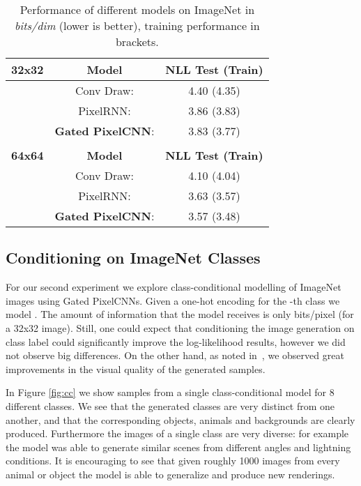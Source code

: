 \documentclass{article}
\begin{document}
\begin{table}[h]
\centering
  \begin{tabular}{lcc}
    \toprule
    \textbf{32x32} & \textbf{Model} & \textbf{NLL Test (Train)}  \\ 
    \midrule
      & Conv Draw: \cite{conceptcompression} & 4.40 (4.35) \\
      & PixelRNN: \cite{van2016pixel} & 3.86 (3.83) \\ 
      & \textbf{Gated PixelCNN}: & 3.83 (3.77) \\
    \\
    \textbf{64x64} & \textbf{Model} & \textbf{NLL Test (Train)}  \\ 
    \midrule
      & Conv Draw: \cite{conceptcompression} & 4.10 (4.04) \\
      & PixelRNN: \cite{van2016pixel} & 3.63 (3.57) \\ 
      & \textbf{Gated PixelCNN}: & 3.57 (3.48) \\
    \bottomrule
  \end{tabular}
\vspace{5pt}
\caption{Performance of different models on ImageNet in \emph{bits/dim} (lower is better), training performance in brackets.}
\label{table:imnet}
\end{table}

\subsection{Conditioning on ImageNet Classes}

For our second experiment we explore class-conditional modelling of ImageNet images using Gated PixelCNNs. Given a one-hot encoding  for the -th class we model . The amount of information that the model receives is only  bits/pixel (for a 32x32 image). Still, one could expect that conditioning the image generation on class label could significantly improve the log-likelihood results, however we did not observe big differences. On the other hand, as noted in~\cite{theis2015note}, we  observed great improvements in the visual quality of the generated samples.

In Figure \ref{fig:cc} we show samples from a single class-conditional model for 8 different classes. We see that the generated classes are very distinct from one another, and that the corresponding objects, animals and backgrounds are clearly produced. Furthermore the images of a single class are very diverse: for example the model was able to generate similar scenes from different angles and lightning conditions. 
It is encouraging to see that given roughly 1000 images from every animal or object the model is able to generalize and produce new renderings. 
\end{document}
